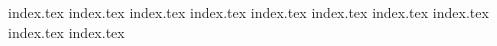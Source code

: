 {index.tex}
{index.tex}
{index.tex}
{index.tex}
{index.tex}
{index.tex}
{index.tex}
{index.tex}
{index.tex}
{index.tex}
